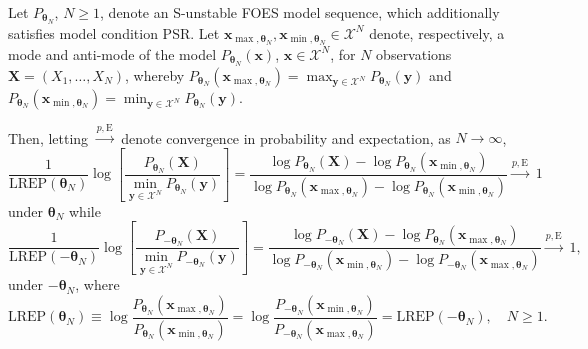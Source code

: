 \documentclass[]{article}
\theoremstyle{definition}
\newcommand{\REP}{\mathrm{LREP}}
\let\BeginKnitrBlock\begin \let\EndKnitrBlock\end
\begin{document}
\BeginKnitrBlock{theorem}
\protect\hypertarget{thm:something}{}{\label{thm:something} }Let
\(P_{\boldsymbol \theta_N}\), \(N \geq 1\), denote an S-unstable FOES
model sequence, which additionally satisfies model condition PSR. Let
\(\boldsymbol{x}_{\max, \boldsymbol \theta_N},\boldsymbol{x}_{\min, \boldsymbol \theta_N}\in\mathcal{X}^N\)
denote, respectively, a mode and anti-mode of the model
\(P_{\boldsymbol \theta_N}(\boldsymbol x)\),
\(\boldsymbol x\in\mathcal{X}^N\), for \(N\) observations
\(\boldsymbol X = (X_1,\ldots,X_N)\), whereby
\(P_{\boldsymbol \theta_N }(\boldsymbol{x}_{\max, \boldsymbol \theta_N}) = \max_{\boldsymbol y\in\mathcal{X}^N} P_{\boldsymbol \theta_N }(\boldsymbol y)\)
and
\(P_{\boldsymbol \theta_N }(\boldsymbol{x}_{\min, \boldsymbol \theta_N}) = \min_{\boldsymbol y\in\mathcal{X}^N} P_{\boldsymbol \theta_N }(\boldsymbol y)\).

Then, letting \(\stackrel{p, \mathrm{E}}{\longrightarrow}\) denote
convergence in probability and expectation, as \(N\to \infty\), \[
\frac{1}{\REP(\boldsymbol \theta_N)} \log\left[ \frac{P_{\boldsymbol \theta_N }(\boldsymbol X) }{ \displaystyle{\min_{\boldsymbol y\in\mathcal{X}^N}} P_{\boldsymbol \theta_N }(\boldsymbol y)}\right] = \frac{ \log P_{\boldsymbol \theta_N } ( \boldsymbol X)  - \log P_{\boldsymbol \theta_N }(\boldsymbol{x}_{\min, \boldsymbol \theta_N}) }
{ \log P_{\boldsymbol \theta_N } (\boldsymbol{x}_{\max, \boldsymbol \theta_N})  - \log P_{\boldsymbol \theta_N }(\boldsymbol{x}_{\min, \boldsymbol \theta_N}) }
\stackrel{p, \mathrm{E}}{\longrightarrow}
\; 1
\] under \(\boldsymbol\theta_N\) while \[
\frac{1}{\REP(-\boldsymbol \theta_N)} \log\left[ \frac{P_{-\boldsymbol \theta_N }(\boldsymbol X) }{  \displaystyle{\min_{\boldsymbol y\in\mathcal{X}^N}} P_{-\boldsymbol \theta_N }(\boldsymbol y)} \right]
=    \frac{ \log P_{-\boldsymbol \theta_N } ( \boldsymbol X) - \log P_{ \boldsymbol \theta_N }(\boldsymbol{x}_{\max, \boldsymbol \theta_N})    }
{ \log P_{-\boldsymbol \theta_N } (\boldsymbol{x}_{\min, \boldsymbol \theta_N})  - \log P_{-\boldsymbol \theta_N }(\boldsymbol{x}_{\max, \boldsymbol \theta_N}) }
\stackrel{p,\mathrm{E}}{\longrightarrow}
\; 1,
\] under \(-\boldsymbol\theta_N\), where \[
\REP( \boldsymbol \theta_N) \equiv \log \frac{P_{\boldsymbol \theta_N } (\boldsymbol{x}_{\max, \boldsymbol \theta_N})}{P_{\boldsymbol \theta_N }(\boldsymbol{x}_{\min, \boldsymbol \theta_N})} = \log  \frac{P_{-\boldsymbol \theta_N } (\boldsymbol{x}_{\min, \boldsymbol \theta_N}) }{ P_{-\boldsymbol \theta_N }(\boldsymbol{x}_{\max, \boldsymbol \theta_N})}=   \REP( -\boldsymbol \theta_N), \quad N \geq 1.
\]
\EndKnitrBlock{theorem}
\end{document}
